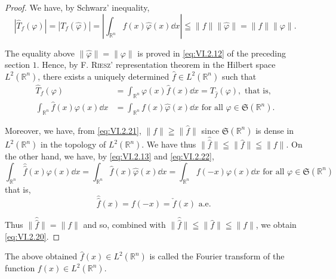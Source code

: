 \begin{proof}
 We have, by Schwarz' inequality, 
\begin{equation}\label{eq:VI.2.21}
\left| \hat {T} _{f} (\varphi) \right| = \left| T _{f} (\hat {\varphi}) \right| = \left| \int_ {\mathbb{R}^{n}} f (x) \hat {\varphi} (x) \dd x \right| \leqq \| f \| \| \hat {\varphi} \| = \| f \| \| \varphi \|. \end{equation}

The equality above $\|\hat{\varphi}\| = \|\varphi\|$ is proved in \eqref{eq:VI.2.12} of the preceding section $1$. Hence, by F. \textsc{Riesz}' representation theorem in the Hilbert space $L^2(\mathbb{R}^{n})$, there exists a uniquely determined $\hat{f} \in L^2(\mathbb{R}^{n})$ such that 
\begin{equation}\label{eq:VI.2.22}
\begin{aligned}
\hat {T} _{f} (\varphi) &= \int_ {\mathbb{R}^{n}} \varphi (x) \hat {f} (x) \dd x = T _ {\hat {f}} (\varphi), \text{ that is, }
\\
\int_ {\mathbb{R}^{n}} \hat {f} (x) \varphi (x) \dd x &= \int_ {\mathbb{R}^{n}} f (x) \hat {\varphi} (x) \dd x \text{ for all } \varphi \in \mathfrak {S} (\mathbb{R}^{n}).
\end{aligned}
\end{equation}

Moreover, we have, from \eqref{eq:VI.2.21}, $\|f\| \geqq \|\hat{f}\|$ since $\mathfrak{S}(\mathbb{R}^{n})$ is dense in $L^2(\mathbb{R}^{n})$ in the topology of $L^2(\mathbb{R}^{n})$. We have thus $\|\hat{\hat{f}}\| \leqq \|\hat{f}\| \leqq \|f\|$. On the other hand, we have, by \eqref{eq:VI.2.13} and \eqref{eq:VI.2.22}, 
\[
\int_{\mathbb{R}^{n}} \hat {\hat {f}} (x) \varphi (x) \dd x = \int_ {\mathbb{R}^{n}} \hat {f} (x) \hat {\varphi} (x) \dd x = \int_ {\mathbb{R}^{n}} f (- x) \varphi (x) \dd x \text{ for all } \varphi \in \mathfrak {S} (\mathbb{R}^{n})
\]
that is, 
\begin{equation}\label{eq:VI.2.23}
\hat {\hat {f}} (x) = f (- x) = \check {f} (x) \text{ a.e. }
\end{equation}

Thus $\|\hat{\hat{f}}\| = \|f\|$ and so, combined with $\|\hat{\hat{f}}\| \leqq \|\hat{f}\| \leqq \|f\|$, we obtain \eqref{eq:VI.2.20}. 
\end{proof}

\begin{definition}\label{def:VI.2.Definition.5} The above obtained $\hat{f}(x) \in L^{2}(\mathbb{R}^{n})$ is called the Fourier transform of the function $f(x) \in L^{2}(\mathbb{R}^{n})$. 
\end{definition}


